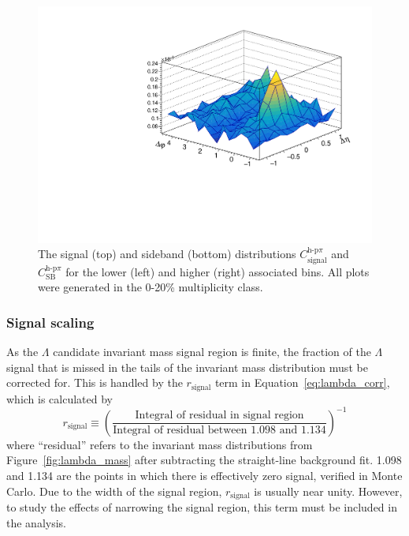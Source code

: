 \begin{figure}[ht]
\begin{minipage}{0.48\textwidth}
	\end{minipage}
	\begin{minipage}{0.48\textwidth}
		\includegraphics[width=\textwidth]{figures/analysis/h_lambda_rsb_dist_highpt.pdf}
	\end{minipage}
	\caption{The signal (top) and sideband (bottom) distributions $C_{\text{signal}}^{\text{h-p}\pi}$ and $C_{\text{SB}}^{\text{h-p}\pi}$ for the lower (left) and higher (right) associated \pt bins. All plots were generated in the 0-20\% multiplicity class.}
	\label{fig:lambda_signal_sideband}
\end{figure}

\subsubsection{Signal scaling}

As the $\Lambda$ candidate invariant mass signal region is finite, the fraction of the $\Lambda$ signal that is missed in the tails of the invariant mass distribution must be corrected for. This is handled by the $r_{\text{signal}}$ term in Equation~\ref{eq:lambda_corr}, which is calculated by 
%
\begin{equation}
	\label{eq:signal_scaling}
	r_{\text{signal}} \equiv (\frac{\text{Integral of residual in signal region}}{\text{Integral of residual between 1.098 and 1.134}})^{-1}
\end{equation}
%
where ``residual'' refers to the invariant mass distributions from Figure~\ref{fig:lambda_mass} after subtracting the straight-line background fit. 1.098 and 1.134 are the points in which there is effectively zero signal, verified in Monte Carlo. Due to the width of the signal region, $r_{\text{signal}}$ is usually near unity. However, to study the effects of narrowing the signal region, this term must be included in the analysis.

